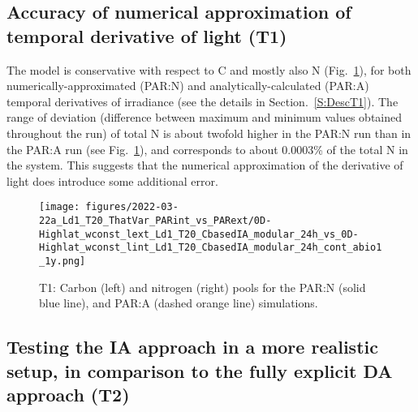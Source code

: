 \documentclass[gmd, manuscript]{copernicus}
\newcommand{\onur}[1]{\textcolor{blue}{\{Onur: #1\}}}
\newcommand{\markus}[1]{\textcolor{blue}{\{Markus: #1\}}}
\begin{document}
\subsection{Accuracy of numerical approximation of temporal derivative of light (T1)}
The model is conservative with respect to C and mostly also N (Fig.~\ref{f.T1res}), for both numerically-approximated (PAR:N) and analytically-calculated (PAR:A) temporal derivatives of irradiance (see the details in Section.~\ref{S:DescT1}). The range of deviation (difference between maximum and minimum values obtained throughout the run) of total N is about twofold higher in the PAR:N run than in the PAR:A run (see Fig.~\ref{f.T1res}), and corresponds to about 0.0003\% of the total N in the system. This suggests that the numerical approximation of the derivative of light does introduce some additional error.

\begin{figure}[ht!]
\texttt{[image: figures/2022-03-22a\_Ld1\_T20\_ThatVar\_PARint\_vs\_PARext/0D-Highlat\_wconst\_lext\_Ld1\_T20\_CbasedIA\_modular\_24h\_vs\_0D-Highlat\_wconst\_lint\_Ld1\_T20\_CbasedIA\_modular\_24h\_cont\_abio1\_1y.png]}
\caption{T1: Carbon (left) and nitrogen (right) pools for the PAR:N (solid blue line), and PAR:A (dashed orange line) simulations.
\label{f.T1res}}
\end{figure}

\FloatBarrier%

\subsection{Testing the IA approach in a more realistic setup, in comparison to the fully explicit DA approach (T2)}
\end{document}
